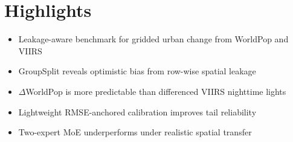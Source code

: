 \documentclass[12pt]{article}
\begin{document}
\section*{Highlights}

\begin{itemize}
    \item Leakage-aware benchmark for gridded urban change from WorldPop and VIIRS
    \item GroupSplit reveals optimistic bias from row-wise spatial leakage
    \item $\Delta$WorldPop is more predictable than differenced VIIRS nighttime lights
    \item Lightweight RMSE-anchored calibration improves tail reliability
    \item Two-expert MoE underperforms under realistic spatial transfer
\end{itemize}
\end{document}
